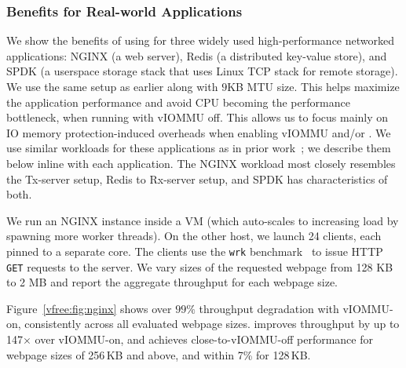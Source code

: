 \subsubsection{{\vfreename} Benefits for Real-world Applications}
\label{vfree:ssec:real-world}
We show the benefits of using {\vfreename} for three widely used high-performance 
    networked applications: 
    NGINX (a web server), 
    Redis (a distributed key-value store), 
    and SPDK (a userspace storage stack that uses Linux TCP stack for remote storage).
We use the same setup as earlier along with $9$KB MTU size. This helps maximize the application performance and avoid CPU becoming the performance bottleneck, when running with vIOMMU off. This allows us to focus mainly on IO memory protection-induced overheads when enabling vIOMMU and/or {\vfreename}. 
We use similar workloads for these applications as in prior work~\cite{Rubin2024FastSafe}; we describe them below inline with each application.  The NGINX workload most closely resembles the Tx-server setup, Redis to Rx-server setup, and SPDK has characteristics of both. 

We run an NGINX instance inside a VM (which auto-scales to increasing load by spawning more worker threads). 
On the other host, we launch 24 clients, each pinned to a separate core. 
The clients use the \texttt{wrk} benchmark~\cite{wrk} to issue HTTP \texttt{GET} requests to the server.
We vary sizes of the requested webpage from 128 KB to 2 MB and report the aggregate throughput for each webpage size.

Figure~\ref{vfree:fig:nginx} shows over {$99\%$} throughput degradation with vIOMMU-on, 
    consistently across all evaluated webpage sizes.
\vfreebrand improves throughput by up to 147$\times$ over vIOMMU-on,
    and achieves close-to-vIOMMU-off performance for webpage sizes of 256\,KB and above, and within 7\% for 128\,KB.

